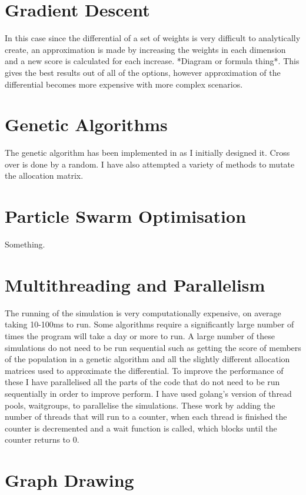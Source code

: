 \section{Gradient Descent}

In this case since the differential of a set of weights is very difficult to analytically create, an approximation is made by increasing the weights in each dimension and a new score is calculated for each increase. *Diagram or formula thing*. This gives the best results out of all of the options, however approximation of the differential becomes more expensive with more complex scenarios.

\section{Genetic Algorithms}

The genetic algorithm has been implemented in as I initially designed it. Cross over is done by a random. I have also attempted a variety of methods to mutate the allocation matrix.

\section{Particle Swarm Optimisation}

Something.

\section{Multithreading and Parallelism}

The running of the simulation is very computationally expensive, on average taking 10-100ms to run. Some algorithms require a significantly large number of times the program will take a day or more to run. A large number of these simulations do not need to be run sequential such as getting the score of members of the population in a genetic algorithm and all the slightly different allocation matrices used to approximate the differential. To improve the performance of these I have parallelised all the parts of the code that do not need to be run sequentially in order to improve perform. I have used golang's version of thread pools, waitgroups, to parallelise the simulations. These work by adding the number of threads that will run to a counter, when each thread is finished the counter is decremented and a wait function is called, which blocks until the counter returns to 0.

\section{Graph Drawing}

